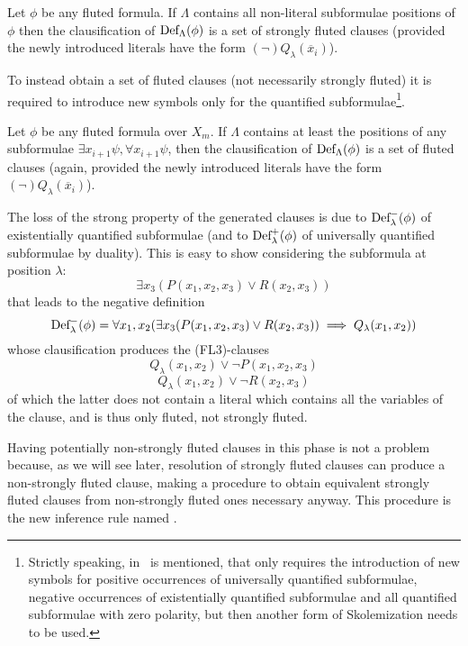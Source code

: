 \begin{lemma}
  Let \(\phi\) be any fluted formula. If \(\Lambda\) contains all non-literal subformulae positions of \(\phi\) then the clausification of \(\fldef{\Lambda}{\phi}\) is a set of strongly fluted clauses (provided the newly introduced literals have the form \((\neg)Q_\lambda(\overline{x}_i)\)).
\end{lemma}
To instead obtain a set of fluted clauses (not necessarily strongly fluted) it is required to introduce new symbols only for the quantified subformulae\footnote{
  Strictly speaking, in~\cite{hustadt2000resolution} is mentioned, that only requires the introduction of new symbols for positive occurrences of universally quantified subformulae, negative occurrences of existentially quantified subformulae and all quantified subformulae with zero polarity, but then another form of Skolemization needs to be used.
}.

\begin{lemma}\label{lem:fluted-def-constraints}
  Let \(\phi\) be any fluted formula over \(X_m\). If \(\Lambda\) contains at least the positions of any subformulae \(\exists x_{i+1}\psi, \forall x_{i+1}\psi\), then the clausification of \(\fldef{\Lambda}{\phi}\) is a set of fluted clauses (again, provided the newly introduced literals have the form \((\neg)Q_\lambda(\overline{x}_i)\)).
\end{lemma}

The loss of the strong property of the generated clauses is due to \(\fldef{\lambda}[-]{\phi}\) of existentially quantified subformulae (and to \(\fldef{\lambda}[+]{\phi}\) of universally quantified subformulae by duality).
This is easy to show considering the subformula at position \(\lambda\):
  \[
    \exists x_3 (P(x_1,x_2,x_3) \lor R(x_2,x_3))
  \]
that leads to the negative definition
  \[
    \fldef{\lambda}[-]{\phi} = \forall x_1,x_2(\exists x_3 (P(x_1,x_2,x_3) \lor R(x_2,x_3)) \implies Q_\lambda(x_1,x_2))
  \]
whose clausification produces the (FL3)-clauses
  \[
    Q_\lambda(x_1,x_2) \lor \neg P(x_1,x_2,x_3)
  \]
  \[
    Q_\lambda(x_1,x_2) \lor \neg R(x_2,x_3)
  \]
of which the latter does not contain a literal which contains all the variables of the clause, and is thus only fluted, not strongly fluted.

Having potentially non-strongly fluted clauses in this phase is not a problem because, as we will see later, resolution of strongly fluted clauses can produce a non-strongly fluted clause, making a procedure to obtain equivalent strongly fluted clauses from non-strongly fluted ones necessary anyway.
This procedure is the new inference rule named .
